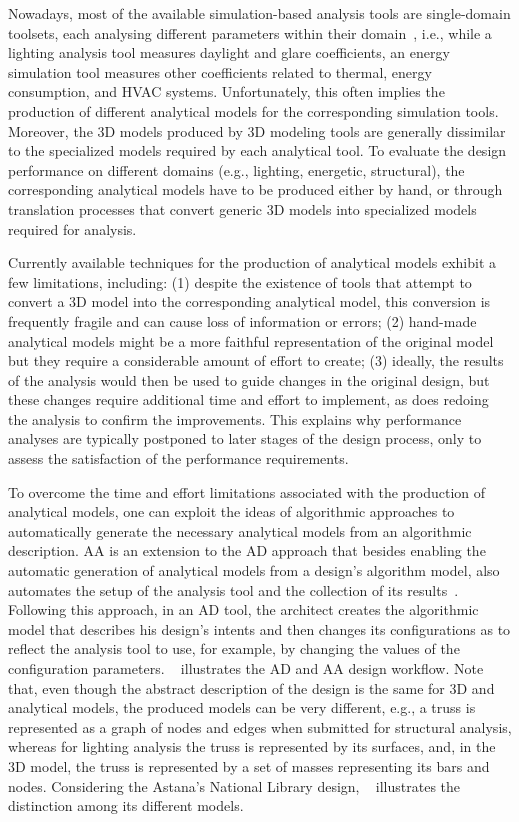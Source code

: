 	Nowadays, most of the available simulation-based analysis tools are single-domain toolsets, each analysing different parameters within their domain~\cite{Malkawi2005}, i.e., while a lighting analysis tool measures daylight and glare coefficients, an energy simulation tool measures other coefficients related to thermal, energy consumption, and \ac{HVAC} systems. Unfortunately, this often implies the production of different analytical models for the corresponding simulation tools. Moreover, the 3D models produced by 3D modeling tools are generally dissimilar to the specialized models required by each analytical tool. To evaluate the design performance on different domains (e.g., lighting, energetic, structural), the corresponding analytical models have to be produced either by hand, or through translation processes that convert  generic 3D models into specialized models required for analysis.

	Currently available techniques for the production of analytical models exhibit a few limitations, including: (1) despite the existence of tools that attempt to convert a 3D model into the corresponding analytical model, this conversion is frequently fragile and can cause loss of information or errors; (2) hand-made analytical models might be a more faithful representation of the original model but they require a considerable amount of effort to create; (3) ideally, the results of the analysis would then be used to guide changes in the original design, but these changes require additional time and effort to implement, as does redoing the analysis to confirm the improvements. This explains why performance analyses are typically postponed to later stages of the design process, only to assess the satisfaction of the performance requirements.

	To overcome the time and effort limitations associated with the production of analytical models, one can exploit the ideas of algorithmic approaches to automatically generate the necessary analytical models from an algorithmic description. \ac{AA} is an extension to the \ac{AD} approach that besides enabling the automatic generation of analytical models from a design's algorithm  model, also automates the setup of the analysis tool and the collection of its results~\cite{Aguiar2017}. Following this approach, in an \ac{AD} tool, the architect creates the algorithmic model that describes his design's intents and then changes its configurations as to reflect the analysis tool to use, for example, by changing the values of the configuration parameters. ~ illustrates the \ac{AD} and \ac{AA} design workflow. Note that, even though the abstract description of the design is the same for 3D and analytical models, the produced models can be very different, e.g., a truss is represented as a graph of nodes and edges when submitted for structural analysis, whereas for lighting analysis the truss is represented by its surfaces, and, in the 3D model, the truss is represented by a set of masses representing its bars and nodes. Considering the Astana's National Library design, ~ illustrates the distinction among its different models.

